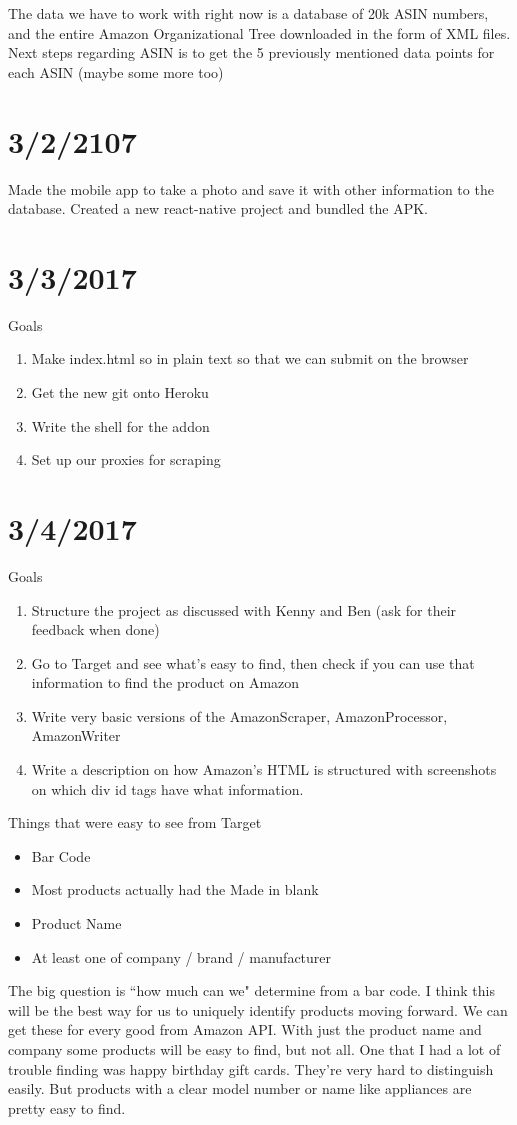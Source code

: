 \documentclass[12pt]{article}
\begin{document}
The data we have to work with right now is a database of 20k ASIN numbers, and the entire Amazon Organizational Tree downloaded in the form of XML files. Next steps regarding ASIN is to get the 5 previously mentioned data points for each ASIN (maybe some more too)

\section*{3/2/2107}
Made the mobile app to take a photo and save it with other information to the database. Created a new react-native project and bundled the APK.

\section*{3/3/2017}
Goals 
\begin{enumerate}
	\item Make index.html so in plain text so that we can submit on the browser
	\item Get the new git onto Heroku
	\item Write the shell for the addon 
	\item Set up our proxies for scraping 
\end{enumerate}

\section*{3/4/2017}
Goals 
\begin{enumerate}
	\item Structure the project as discussed with Kenny and Ben (ask for their feedback when done)
	\item Go to Target and see what's easy to find, then check if you can use that information to find the product on Amazon
	\item Write very basic versions of the AmazonScraper, AmazonProcessor, AmazonWriter
	\item Write a description on how Amazon's HTML is structured with screenshots on which div id tags have what information. 
\end{enumerate}

Things that were easy to see from Target 

\begin{itemize}
	\item Bar Code
	\item Most products actually had the Made in blank 
	\item Product Name
	\item At least one of company / brand / manufacturer
\end{itemize}

The big question is ``how much can we" determine from a bar code. I think this will be the best way for us to uniquely identify products moving forward. We can get these for every good from Amazon API. With just the product name and company some products will be easy to find, but not all. One that I had a lot of trouble finding was happy birthday gift cards. They're very hard to distinguish easily. But products with a clear model number or name like appliances are pretty easy to find. 
\end{document}
